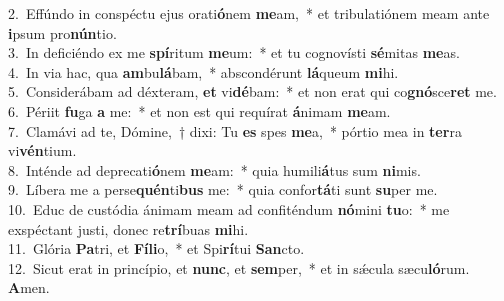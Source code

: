 {2.~}Effúndo in conspéctu ejus orati\textbf{ó}nem \textbf{me}am,~* et tribulatiónem meam ante \textbf{i}psum pro\textbf{nún}tio.\\
{3.~}In deficiéndo ex me \textbf{spí}ritum \textbf{me}um:~* et tu cognovísti \textbf{sé}mitas \textbf{me}as.\\
{4.~}In via hac, qua \textbf{am}bu\textbf{lá}bam,~* abscondérunt \textbf{lá}queum \textbf{mi}hi.\\
{5.~}Considerábam ad déxteram, \textbf{et} vi\textbf{dé}bam:~* et non erat qui co\textbf{gnó}sce\textbf{ret} me.\\
{6.~}Périit \textbf{fu}ga \textbf{a} me:~* et non est qui requírat \textbf{á}nimam \textbf{me}am.\\
{7.~}Clamávi ad te, Dómine,~† dixi: Tu \textbf{es} spes \textbf{me}a,~* pórtio mea in \textbf{ter}ra vi\textbf{vén}tium.\\
{8.~}Inténde ad deprecati\textbf{ó}nem \textbf{me}am:~* quia humili\textbf{á}tus sum \textbf{ni}mis.\\
{9.~}Líbera me a perse\textbf{quén}ti\textbf{bus} me:~* quia confor\textbf{tá}ti sunt \textbf{su}per me.\\
{10.~}Educ de custódia ánimam meam ad confiténdum \textbf{nó}mini \textbf{tu}o:~* me exspéctant justi, donec re\textbf{trí}buas \textbf{mi}hi.\\
{11.~}Glória \textbf{Pa}tri, et \textbf{Fí}\textbf{li}o,~* et Spi\textbf{rí}tui \textbf{San}cto.\\
{12.~}Sicut erat in princípio, et \textbf{nunc}, et \textbf{sem}per,~* et in sǽcula sæcu\textbf{ló}rum. \textbf{A}men.\\
